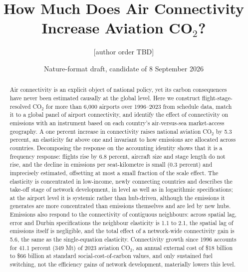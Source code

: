 \documentclass[12pt]{extarticle}
\title{How Much Does Air Connectivity Increase Aviation CO$_2$?}
\author{[author order TBD]}
\date{Nature-format draft, candidate of 8 September 2026}
\begin{document}
\maketitle

\begin{abstract}
\noindent Air connectivity is an explicit object of national policy, yet its
carbon consequences have never been estimated causally at the global level.
Here we construct flight-stage-resolved CO$_2$ for more than 6{,}000
airports over 1996--2023 from schedule data, match it to a global panel of
airport connectivity, and identify the effect of connectivity on emissions
with an instrument based on each country's air-versus-sea market-access
geography. A one percent increase in connectivity raises national aviation
CO$_2$ by 5.3 percent, an elasticity far above one and invariant to how
emissions are allocated across countries. Decomposing the response on the
accounting identity shows that it is a frequency response: flights rise by
6.8 percent, aircraft size and stage length do not rise, and the decline in
emissions per seat-kilometre is small (0.3 percent) and imprecisely
estimated, offsetting at most a small fraction of the scale effect. 
The elasticity is concentrated in low-income, newly connecting
countries and describes the take-off stage of network development, in
level as well as in logarithmic specifications; at the airport level it is systemic rather than hub-driven,
although the emissions it generates are more concentrated than emissions
themselves and are led by new hubs. Emissions also respond to the
connectivity of contiguous neighbours: across spatial lag, error and Durbin
specifications the neighbour elasticity is 1.1 to 2.1, the spatial lag of
emissions itself is negligible, and the total effect of a network-wide
connectivity gain is 5.6, the same as the single-equation elasticity. Connectivity growth since
1996 accounts for 41.1 percent (349 Mt) of 2023 aviation CO$_2$, an annual
external cost of \$18 billion to \$66 billion at standard social-cost-of-carbon
values, and only sustained fuel switching, not the efficiency gains of
network development, materially lowers this level.
\end{abstract}

\end{document}

